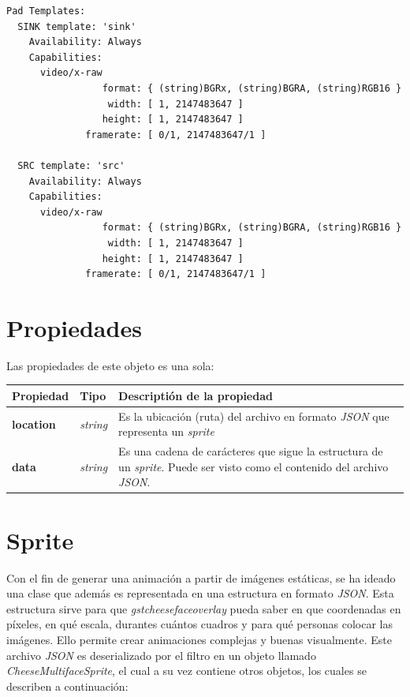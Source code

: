 \documentclass[a4paper,openright,12pt]{report}
\begin{document}
\begin{verbatim}
Pad Templates:
  SINK template: 'sink'
    Availability: Always
    Capabilities:
      video/x-raw
                 format: { (string)BGRx, (string)BGRA, (string)RGB16 }
                  width: [ 1, 2147483647 ]
                 height: [ 1, 2147483647 ]
              framerate: [ 0/1, 2147483647/1 ]
  
  SRC template: 'src'
    Availability: Always
    Capabilities:
      video/x-raw
                 format: { (string)BGRx, (string)BGRA, (string)RGB16 }
                  width: [ 1, 2147483647 ]
                 height: [ 1, 2147483647 ]
              framerate: [ 0/1, 2147483647/1 ]
\end{verbatim}


\section{Propiedades}
Las propiedades de este objeto es una sola:
\begin{center}
  \begin{longtable}{| p{} | p{} | p{} |}
  \hline

  \textbf{Propiedad} &
  \textbf{Tipo} &
  \textbf{Descriptión de la propiedad}
  \\ \hline

  \textbf{location} &
  \textit{string} &
  Es la ubicación (ruta) del archivo en formato \textit{JSON} que representa un
  \textit{sprite}
  \\ \hline

  \textbf{data} &
  \textit{string} &
  Es una cadena de carácteres que sigue la estructura de un \textit{sprite}.
  Puede ser visto como el contenido del archivo \textit{JSON}.
  \\ \hline
  \end{longtable}
\end{center}

\section{Sprite}
Con el fin de generar una animación a partir de imágenes estáticas, se ha ideado
una clase que además es representada en una estructura en formato \textit{JSON}.
Esta estructura sirve para que \textit{gstcheesefaceoverlay} pueda saber en que
coordenadas en píxeles, en qué escala, durantes cuántos cuadros y para qué
personas colocar las imágenes. Ello permite crear animaciones complejas y
buenas visualmente. Este archivo \textit{JSON} es deserializado por
el filtro en un objeto llamado \textit{CheeseMultifaceSprite}, el cual a su vez
contiene otros objetos, los cuales se describen a continuación:\\
\end{document}
